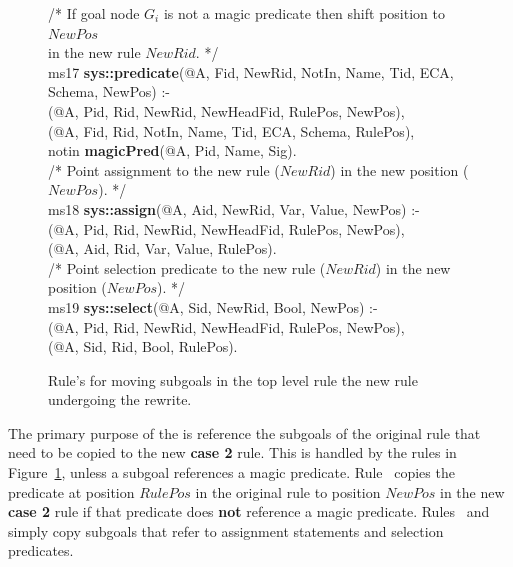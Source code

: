 \begin{figure}[!t]
\ssp
\centering
\begin{boxedminipage}{\linewidth}
/* If goal node $G_i$ is not a magic predicate then shift position to $NewPos$  \\
   in the new rule $NewRid$. */ \\
ms17 {\bf sys::predicate}(@A, Fid, NewRid, NotIn, Name, Tid, ECA, Schema, NewPos) :- \\
(@A, Pid, Rid, NewRid, NewHeadFid, RulePos, NewPos), \\
(@A, Fid, Rid, NotIn, Name, Tid, ECA, Schema, RulePos), \\
\datalogspace notin {\bf magicPred}(@A, Pid, Name, Sig). \\
	
/* Point assignment to the new rule ($NewRid$) in the new position ($NewPos$). */ \\
ms18 {\bf sys::assign}(@A, Aid, NewRid, Var, Value, NewPos) :- \\
(@A, Pid, Rid, NewRid, NewHeadFid, RulePos, NewPos), \\
(@A, Aid, Rid, Var, Value, RulePos). \\
	
/* Point selection predicate to the new rule ($NewRid$) in the new position ($NewPos$). */ \\
ms19 {\bf sys::select}(@A, Sid, NewRid, Bool, NewPos) :- \\
(@A, Pid, Rid, NewRid, NewHeadFid, RulePos, NewPos), \\
(@A, Sid, Rid, Bool, RulePos).

\end{boxedminipage}
\caption{\label{ch:magic:fig:rewrite3} Rule's for moving subgoals in the top level rule
the new rule undergoing the rewrite. }
\end{figure}

The primary purpose of the  is reference the subgoals of the
original rule that need to be copied to the new {\bf case 2} rule.  This is
handled by the rules in Figure~\ref{ch:magic:fig:rewrite3}, unless a subgoal
references a magic predicate.  Rule~ copies the predicate at position
$RulePos$ in the original rule to position $NewPos$ in the new {\bf case 2}
rule if that predicate does {\bf not} reference a magic predicate.
Rules~ and  simply copy subgoals that refer to assignment
statements and selection predicates.


